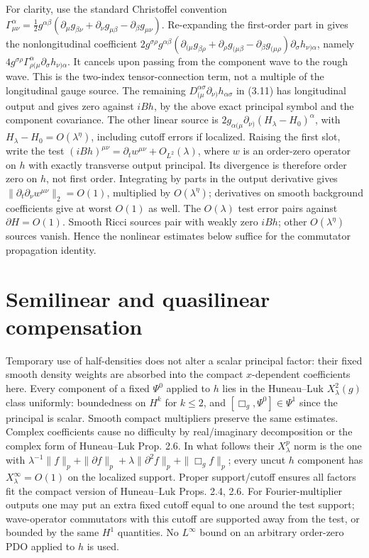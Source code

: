 \documentclass[11pt]{article}
\begin{document}
For clarity, use the standard Christoffel convention
\(\Gamma^\alpha_{\mu\nu}=\frac12g^{\alpha\beta}(\partial_\mu g_{\beta\nu}+\partial_\nu g_{\mu\beta}-\partial_\beta g_{\mu\nu})\).
Re-expanding the first-order part in \cite[Eq.~(3.9) and App.~A]{HL} gives the nonlongitudinal coefficient
\(2g^{\sigma\rho}g^{\alpha\beta}(\partial_{(\mu}g_{\beta\rho}+\partial_\rho g_{(\mu\beta}-\partial_\beta g_{(\mu\rho})\partial_\sigma h_{\nu)\alpha}\),
namely \(4g^{\sigma\rho}\Gamma^\alpha_{\rho(\mu}\partial_\sigma h_{\nu)\alpha}\).
It cancels upon passing from the component wave to the rough wave. This is the two-index tensor-connection term, not a multiple of the longitudinal gauge source. The remaining \(D_{(\mu}^{\alpha\sigma}\partial_{\nu)}h_{\alpha\sigma}\) in (3.11) has longitudinal output and gives zero against \(iB h\), by the above exact principal symbol and the component covariance. The other linear source is \(2g_{\alpha(\mu}\partial_{\nu)}(H_\lambda-H_0)^\alpha\), with \(H_\lambda-H_0=O(\lambda^\eta)\), including cutoff errors if localized. Raising the first slot, write the test \((iBh)^{\mu\nu}=\partial_t w^{\mu\nu}+O_{L^2}(\lambda)\), where \(w\) is an order-zero operator on \(h\) with exactly transverse output principal. Its divergence is therefore order zero on \(h\), not first order. Integrating by parts in the output derivative gives \(\|\partial_t\partial_\nu w^{\mu\nu}\|_2=O(1)\), multiplied by \(O(\lambda^\eta)\); derivatives on smooth background coefficients give at worst \(O(1)\) as well. The \(O(\lambda)\) test error pairs against \(\partial H=O(1)\). Smooth Ricci sources pair with weakly zero \(iBh\); other \(O(\lambda^\eta)\) sources vanish. Hence the nonlinear estimates below suffice for the commutator propagation identity.

\section{Semilinear and quasilinear compensation}
\label{sec:comp}
Temporary use of half-densities does not alter a scalar principal factor: their fixed smooth density weights are absorbed into the compact \(x\)-dependent coefficients here. Every component of a fixed \(\Psi^0\) applied to \(h\) lies in the Huneau--Luk \(X_\lambda^2(g)\) class uniformly: boundedness on \(H^k\) for \(k\le2\), and \([\Box_g,\Psi^0]\in\Psi^1\) since the principal is scalar. Smooth compact multipliers preserve the same estimates. Complex coefficients cause no difficulty by real/imaginary decomposition or the complex form of Huneau--Luk Prop. 2.6. In what follows their \(X_\lambda^p\) norm is the one with \(\lambda^{-1}\|f\|_p+\|\partial f\|_p+\lambda\|\partial^2 f\|_p+\|\Box_g f\|_p\); every uncut \(h\) component has \(X_\lambda^\infty=O(1)\) on the localized support. Proper support/cutoff ensures all factors fit the compact version of Huneau--Luk Props. 2.4, 2.6. For Fourier-multiplier outputs one may put an extra fixed cutoff equal to one around the test support; wave-operator commutators with this cutoff are supported away from the test, or bounded by the same \(H^1\) quantities. No \(L^\infty\) bound on an arbitrary order-zero PDO applied to \(h\) is used.
\end{document}
